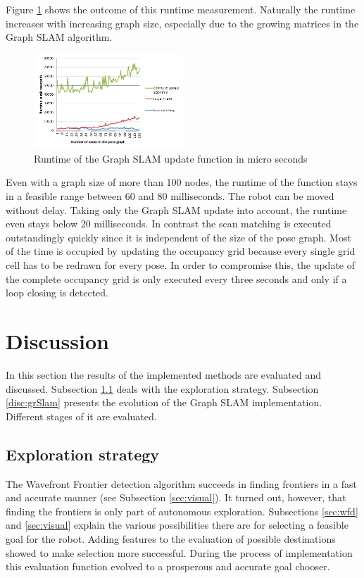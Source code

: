 \documentclass{ba-kecs}
\begin{document}
Figure \ref{fig:runtime} shows the outcome of this runtime measurement. Naturally the runtime increases with increasing graph size, especially due to the growing matrices in the Graph SLAM algorithm.

\begin{figure}[htbp]
	\centering
		\includegraphics[width=0.50\textwidth]{figures/Runtime.png}
	\caption{Runtime of the Graph SLAM update function in micro seconds}
	\label{fig:runtime}
\end{figure}

Even with a graph size of more than 100 nodes, the runtime of the function stays in a feasible range between 60 and 80 milliseconds. The robot can be moved without delay. Taking only the Graph SLAM update into account, the runtime even stays below 20 milliseconds. In contrast the scan matching is executed outstandingly quickly since it is independent of the size of the pose graph. Most of the time is occupied by updating the occupancy grid because every single grid cell has to be redrawn for every pose. In order to compromise this, the update of the complete occupancy grid is only executed every three seconds and only if a loop closing is detected.

\section{Discussion}
\label{sec:disc}
In this section the results of the implemented methods are evaluated and discussed. 
Subsection \ref{disc:expl} deals with the exploration strategy. Subsection \ref{disc:grSlam} presents the evolution of the Graph SLAM implementation. Different stages of it are evaluated.
\subsection{Exploration strategy}
\label{disc:expl}
The Wavefront Frontier detection algorithm \citep{Keidar} succeeds in finding frontiers in a fast and accurate manner (see Subsection \ref{sec:visual}). It turned out, however, that finding the frontiers is only part of autonomous exploration. Subsections \ref{sec:wfd} and \ref{sec:visual} explain the various possibilities there are for selecting a feasible goal for the robot. Adding features to the evaluation of possible destinations showed to make selection more successful. During the process of implementation this evaluation function evolved to a prosperous and accurate goal chooser.
\\
\end{document}
